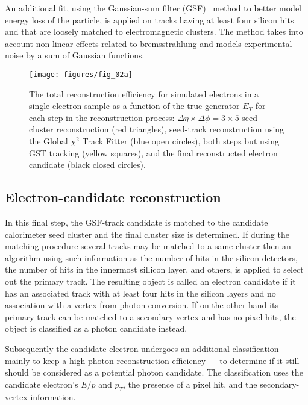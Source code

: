 An additional fit, using the Gaussian-sum filter (GSF)~\cite{gsffit} method to
better model energy loss of the particle, is applied on tracks having at least
four silicon hits and that are loosely matched to electromagnetic clusters. The
method takes into account non-linear effects related to bremsstrahlung and
models experimental noise by a sum of Gaussian functions.


\begin{figure}[H]
	\texttt{[image: figures/fig\_02a]}
	\centering

	\caption{The total reconstruction efficiency for simulated electrons in a single-electron
		sample as a function of the true generator $E_T$ for each step in the reconstruction
		process: $\Delta \eta\times \Delta \phi=3\times 5$ seed-cluster reconstruction (red triangles),
		seed-track reconstruction using the Global $\chi^2$ Track Fitter (blue open circles), both
		steps but using GST tracking (yellow squares), and the final reconstructed electron
		candidate (black closed circles).}

	\label{f:elcidtrackeff}

\end{figure}


\subsection{Electron-candidate reconstruction}

In this final step, the GSF-track candidate is matched to the candidate
calorimeter seed cluster and the final cluster size is determined. If during
the matching procedure several tracks may be matched to a same cluster then an
algorithm using such information as the number of hits in the silicon
detectors, the number of hits in the innermost sillicon layer, and others, is
applied to select out the primary track. The resulting object is called an
electron candidate if it has an associated track with at least four hits in the
silicon layers and no association with a vertex from photon conversion. If on
the other hand its primary track can be matched to a secondary vertex and has
no pixel hits, the object is classified as a photon candidate instead.

Subsequently the candidate electron undergoes an additional classification ---
mainly to keep a high photon-reconstruction efficiency --- to determine if it
still should be considered as a potential photon candidate. The classification
uses the candidate electron's $E/p$ and $p_T$, the presence of a pixel hit, and
the secondary-vertex information.


